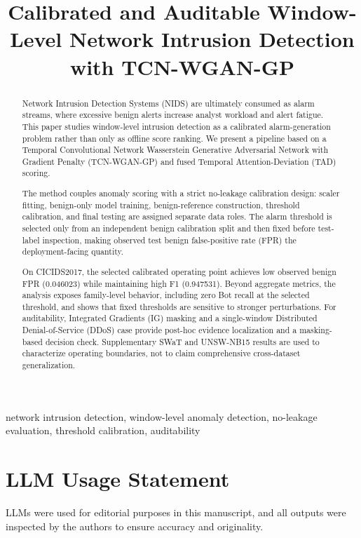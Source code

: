 \documentclass[conference,compsoc]{IEEEtran}
\title{Calibrated and Auditable Window-Level Network Intrusion Detection with TCN-WGAN-GP}
\author{\IEEEauthorblockN{Anonymous Submission}}
\begin{document}
\maketitle

\begin{abstract}
Network Intrusion Detection Systems (NIDS) are ultimately consumed as alarm streams, where excessive benign alerts increase analyst workload and alert fatigue. This paper studies window-level intrusion detection as a calibrated alarm-generation problem rather than only as offline score ranking. We present a pipeline based on a Temporal Convolutional Network Wasserstein Generative Adversarial Network with Gradient Penalty (TCN-WGAN-GP) and fused Temporal Attention-Deviation (TAD) scoring.

The method couples anomaly scoring with a strict no-leakage calibration design: scaler fitting, benign-only model training, benign-reference construction, threshold calibration, and final testing are assigned separate data roles. The alarm threshold is selected only from an independent benign calibration split and then fixed before test-label inspection, making observed test benign false-positive rate (FPR) the deployment-facing quantity.

On CICIDS2017, the selected calibrated operating point achieves low observed benign FPR (0.046023) while maintaining high F1 (0.947531). Beyond aggregate metrics, the analysis exposes family-level behavior, including zero Bot recall at the selected threshold, and shows that fixed thresholds are sensitive to stronger perturbations. For auditability, Integrated Gradients (IG) masking and a single-window Distributed Denial-of-Service (DDoS) case provide post-hoc evidence localization and a masking-based decision check. Supplementary SWaT and UNSW-NB15 results are used to characterize operating boundaries, not to claim comprehensive cross-dataset generalization.
\end{abstract}

\begin{IEEEkeywords}
network intrusion detection, window-level anomaly detection, no-leakage evaluation, threshold calibration, auditability
\end{IEEEkeywords}














\section*{LLM Usage Statement}
LLMs were used for editorial purposes in this manuscript, and all outputs were inspected by the authors to ensure accuracy and originality.
\end{document}
